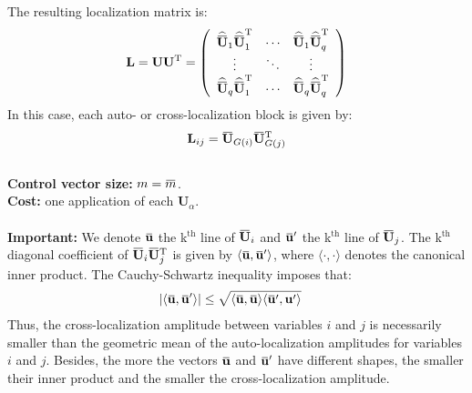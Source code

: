\documentclass[12pt]{scrartcl}
\newcommand{\overbar}[1]{\mkern 1.5mu\overline{\mkern-1.5mu#1\mkern-1.5mu}\mkern 1.5mu}
\begin{document}
The resulting localization matrix is:
\begin{align}
\mathbf{L} = \mathbf{U} \mathbf{U}^\mathrm{T} = \left( \begin{array}{ccc}
\widehat{\overbar{\mathbf{U}}}_1 \widehat{\overbar{\mathbf{U}}}_1^\mathrm{T} & \cdots & \widehat{\overbar{\mathbf{U}}}_1 \widehat{\overbar{\mathbf{U}}}_q^\mathrm{T} \\
\vdots & \ddots & \vdots  \\
\widehat{\overbar{\mathbf{U}}}_q \widehat{\overbar{\mathbf{U}}}_1^\mathrm{T} & \cdots & \widehat{\overbar{\mathbf{U}}}_q \widehat{\overbar{\mathbf{U}}}_q^\mathrm{T}
\end{array} \right)
\end{align}
In this case, each auto- or cross-localization block is given by: 
\begin{align}
\mathbf{L}_{ij} = \overbar{\mathbf{U}}_{G(i)} \overbar{\mathbf{U}}_{G(j)}^\mathrm{T}
\end{align}
$  $\\
\textbf{Control vector size:} $\displaystyle m = \overbar{m}$.\\
\textbf{Cost:} one application of each $\mathbf{U}_\alpha$.\\
$  $\\
\textbf{Important:} We denote $\overbar{\mathbf{u}}$ the k$^\textrm{th}$ line of $\overbar{\mathbf{U}}_i$ and $\overbar{\mathbf{u}}'$ the k$^\textrm{th}$ line of $\overbar{\mathbf{U}}_j$. The k$^\textrm{th}$ diagonal coefficient of $\overbar{\mathbf{U}}_i \overbar{\mathbf{U}}_j^\mathrm{T}$ is given by $\langle \overbar{\mathbf{u}},\overbar{\mathbf{u}}' \rangle$, where $\langle \cdot, \cdot \rangle$ denotes the canonical inner product. The Cauchy-Schwartz inequality imposes that:
\begin{align}
\vert \langle \overbar{\mathbf{u}},\overbar{\mathbf{u}}' \rangle \vert & \le \sqrt{\langle \overbar{\mathbf{u}},\overbar{\mathbf{u}} \rangle \langle \overbar{\mathbf{u}}',\mathbf{u}' \rangle}
\end{align}
Thus, the cross-localization amplitude between variables $i$ and $j$ is necessarily smaller than the geometric mean of the auto-localization amplitudes for variables $i$ and $j$. Besides, the more the vectors $\overbar{\mathbf{u}}$ and $\overbar{\mathbf{u}}'$ have different shapes, the smaller their inner product and the smaller the cross-localization amplitude.
\end{document}

